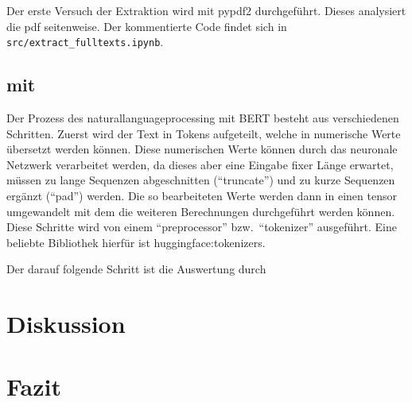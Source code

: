 \documentclass[
german,
]{bachelor}
\begin{document}
Der erste Versuch der Extraktion wird mit \gls{pypdf2} durchgeführt.
Dieses analysiert die \gls{pdf} seitenweise.
Der kommentierte Code findet sich in \texttt{src/extract\_fulltexts.ipynb}.

\subsection{ mit }
Der Prozess des \gls{naturallanguageprocessing} mit \gls{BERT} besteht aus verschiedenen Schritten.
Zuerst wird der Text in Tokens aufgeteilt,
welche in numerische Werte übersetzt werden können.
Diese numerischen Werte können durch das neuronale Netzwerk verarbeitet werden,
da dieses aber eine Eingabe fixer Länge erwartet,
müssen zu lange Sequenzen abgeschnitten (\enquote{truncate})
und zu kurze Sequenzen ergänzt (\enquote{pad}) werden.
Die so bearbeiteten Werte werden dann in einen \gls{tensor} umgewandelt
mit dem die weiteren Berechnungen durchgeführt werden können.
Diese Schritte wird von einem \enquote{preprocessor}
bzw.\, \enquote{tokenizer} ausgeführt.
\autocite{huggingface:docs:Transformers:preprocessing}
Eine beliebte Bibliothek hierfür ist \gls{huggingface:tokenizers}.



Der darauf folgende Schritt ist die Auswertung durch


\section{Diskussion}

\section{Fazit}
\end{document}
